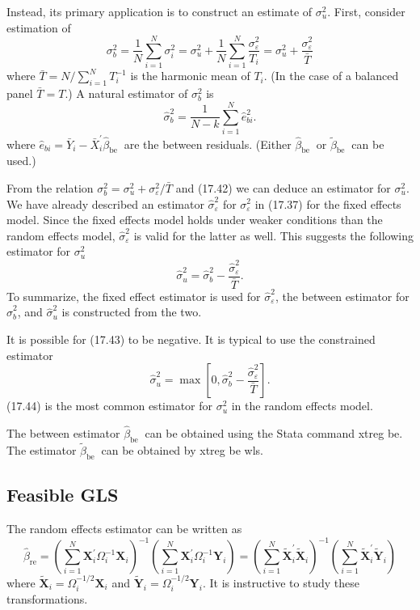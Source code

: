 \documentclass[10pt]{article}
\begin{document}
Instead, its primary application is to construct an estimate of $\sigma_{u}^{2}$. First, consider estimation of
$$
\sigma_{b}^{2}=\frac{1}{N} \sum_{i=1}^{N} \sigma_{i}^{2}=\sigma_{u}^{2}+\frac{1}{N} \sum_{i=1}^{N} \frac{\sigma_{\varepsilon}^{2}}{T_{i}}=\sigma_{u}^{2}+\frac{\sigma_{\varepsilon}^{2}}{\bar{T}}
$$
where $\bar{T}=N / \sum_{i=1}^{N} T_{i}^{-1}$ is the harmonic mean of $T_{i}$. (In the case of a balanced panel $\bar{T}=T$.) A natural estimator of $\sigma_{b}^{2}$ is
$$
\widehat{\sigma}_{b}^{2}=\frac{1}{N-k} \sum_{i=1}^{N} \widehat{e}_{b i}^{2} .
$$
where $\widehat{e}_{b i}=\bar{Y}_{i}-\bar{X}_{i}^{\prime} \widehat{\beta}_{\text {be }}$ are the between residuals. (Either $\widehat{\beta}_{\text {be }}$ or $\widetilde{\beta}_{\text {be }}$ can be used.)

From the relation $\sigma_{b}^{2}=\sigma_{u}^{2}+\sigma_{\varepsilon}^{2} / \bar{T}$ and (17.42) we can deduce an estimator for $\sigma_{u}^{2}$. We have already described an estimator $\widehat{\sigma}_{\varepsilon}^{2}$ for $\sigma_{\varepsilon}^{2}$ in (17.37) for the fixed effects model. Since the fixed effects model holds under weaker conditions than the random effects model, $\widehat{\sigma}_{\varepsilon}^{2}$ is valid for the latter as well. This suggests the following estimator for $\sigma_{u}^{2}$
$$
\widehat{\sigma}_{u}^{2}=\widehat{\sigma}_{b}^{2}-\frac{\widehat{\sigma}_{\varepsilon}^{2}}{\bar{T}} .
$$
To summarize, the fixed effect estimator is used for $\widehat{\sigma}_{\varepsilon}^{2}$, the between estimator for $\widehat{\sigma}_{b}^{2}$, and $\widehat{\sigma}_{u}^{2}$ is constructed from the two.

It is possible for (17.43) to be negative. It is typical to use the constrained estimator
$$
\widehat{\sigma}_{u}^{2}=\max \left[0, \widehat{\sigma}_{b}^{2}-\frac{\widehat{\sigma}_{\varepsilon}^{2}}{\bar{T}}\right] .
$$
(17.44) is the most common estimator for $\sigma_{u}^{2}$ in the random effects model.

The between estimator $\widehat{\beta}_{\text {be }}$ can be obtained using the Stata command xtreg be. The estimator $\widetilde{\beta}_{\text {be }}$ can be obtained by xtreg be wls.

\subsection{Feasible GLS}
The random effects estimator can be written as
$$
\widehat{\beta}_{\mathrm{re}}=\left(\sum_{i=1}^{N} \boldsymbol{X}_{i}^{\prime} \Omega_{i}^{-1} \boldsymbol{X}_{i}\right)^{-1}\left(\sum_{i=1}^{N} \boldsymbol{X}_{i}^{\prime} \Omega_{i}^{-1} \boldsymbol{Y}_{i}\right)=\left(\sum_{i=1}^{N} \widetilde{\boldsymbol{X}}_{i}^{\prime} \widetilde{\boldsymbol{X}}_{i}\right)^{-1}\left(\sum_{i=1}^{N} \widetilde{\boldsymbol{X}}_{i}^{\prime} \widetilde{\boldsymbol{Y}}_{i}\right)
$$
where $\widetilde{\boldsymbol{X}}_{i}=\Omega_{i}^{-1 / 2} \boldsymbol{X}_{i}$ and $\widetilde{\boldsymbol{Y}}_{i}=\Omega_{i}^{-1 / 2} \boldsymbol{Y}_{i}$. It is instructive to study these transformations.
\end{document}
